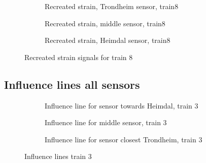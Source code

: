 \begin{figure}[htpb]
  \begin{subfigure}[t]{0.9\textwidth}
    \centering
    
    \caption{Recreated strain, Trondheim sensor, train8} %
    \label{recreated_sensor_trond_train8}
  \end{subfigure}
%
  \begin{subfigure}[t]{0.9\textwidth}
    \centering
    
    \caption{Recreated strain, middle sensor, train8} %
    \label{recreated_sensor_middle_train8}
  \end{subfigure}
%
  \begin{subfigure}[t]{0.9\textwidth}
    \centering
    
    \caption{Recreated strain, Heimdal sensor, train8} %
    \label{recreated_sensor_heimdal_train8}
  \end{subfigure}
%
  \caption{Recreated strain signals for train 8}
  \label{fig:recreated_strains_train8}
\end{figure}%

\subsection{Influence lines all sensors}%

\begin{figure}[htpb]
  \begin{subfigure}[t]{0.9\textwidth}
    \centering
    
    \caption{Influence line for sensor towards Heimdal, train 3}
    \label{infl_Heimdal_train3}
  \end{subfigure}
  \begin{subfigure}[t]{0.9\textwidth}
    \centering
    
    \caption{Influence line for middle sensor, train 3}
    \label{infl_middle_train3}
  \end{subfigure}
  \begin{subfigure}[t]{0.9\textwidth}
    \centering
    
    \caption{Influence line for sensor closest Trondheim, train 3}
    \label{infl_Trondheim_train3}
  \end{subfigure}
  \caption{Influence lines train 3}
  \label{influence_lines_train3}
\end{figure}


